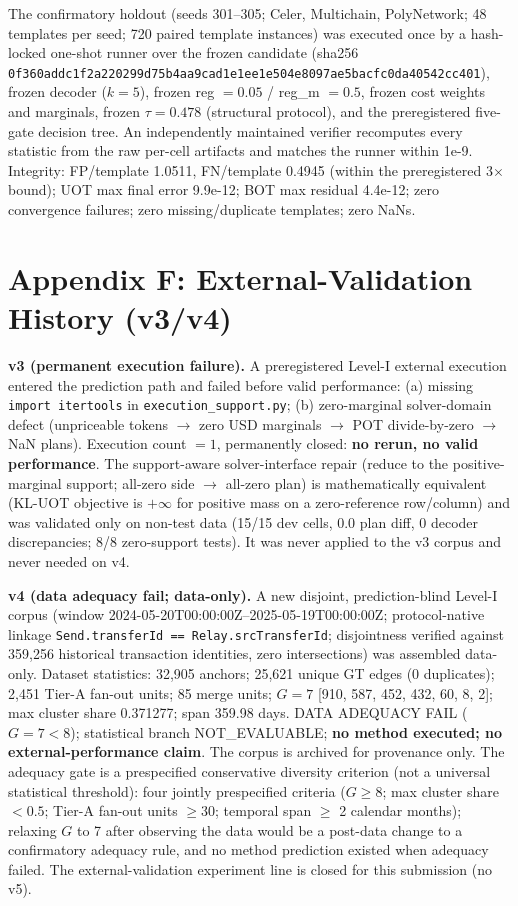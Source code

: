 \documentclass[journal]{IEEEtran}
\begin{document}
The confirmatory holdout (seeds 301--305; Celer, Multichain, PolyNetwork; 48 templates per seed; 720 paired template instances) was executed once by a hash-locked one-shot runner over the frozen candidate (sha256 \texttt{0f360add\-c1f2a220\-299d75b4\-aa9cad1e\-1ee1e504\-e8097ae5\-bacfc0da\-40542cc401}), frozen decoder ($k=5$), frozen reg $=0.05$ / reg\_m $=0.5$, frozen cost weights and marginals, frozen $\tau = 0.478$ (structural protocol), and the preregistered five-gate decision tree. An independently maintained verifier recomputes every statistic from the raw per-cell artifacts and matches the runner within 1e-9. Integrity: FP/template 1.0511, FN/template 0.4945 (within the preregistered 3$\times$ bound); UOT max final error 9.9e-12; BOT max residual 4.4e-12; zero convergence failures; zero missing/duplicate templates; zero NaNs.

\section*{Appendix F: External-Validation History (v3/v4)}

\textbf{v3 (permanent execution failure).} A preregistered Level-I external execution entered the prediction path and failed before valid performance: (a) missing \texttt{import itertools} in \texttt{execution\_support.py}; (b) zero-marginal solver-domain defect (unpriceable tokens $\to$ zero USD marginals $\to$ POT divide-by-zero $\to$ NaN plans). Execution count $= 1$, permanently closed: \textbf{no rerun, no valid performance}. The support-aware solver-interface repair (reduce to the positive-marginal support; all-zero side $\to$ all-zero plan) is mathematically equivalent (KL-UOT objective is $+\infty$ for positive mass on a zero-reference row/column) and was validated only on non-test data (15/15 dev cells, 0.0 plan diff, 0 decoder discrepancies; 8/8 zero-support tests). It was never applied to the v3 corpus and never needed on v4.

\textbf{v4 (data adequacy fail; data-only).} A new disjoint, prediction-blind Level-I corpus (window 2024-05-20T00:00:00Z--2025-05-19T00:00:00Z; protocol-native linkage \texttt{Send.transferId == Relay.srcTransferId}; disjointness verified against 359{,}256 historical transaction identities, zero intersections) was assembled data-only. Dataset statistics: 32{,}905 anchors; 25{,}621 unique GT edges (0 duplicates); 2{,}451 Tier-A fan-out units; 85 merge units; $G = 7$ [910, 587, 452, 432, 60, 8, 2]; max cluster share 0.371277; span 359.98 days. DATA ADEQUACY FAIL ($G = 7 < 8$); statistical branch NOT\_EVALUABLE; \textbf{no method executed; no external-performance claim}. The corpus is archived for provenance only. The adequacy gate is a prespecified conservative diversity criterion (not a universal statistical threshold): four jointly prespecified criteria ($G \ge 8$; max cluster share $< 0.5$; Tier-A fan-out units $\ge 30$; temporal span $\ge$ 2 calendar months); relaxing $G$ to 7 after observing the data would be a post-data change to a confirmatory adequacy rule, and no method prediction existed when adequacy failed. The external-validation experiment line is closed for this submission (no v5).
\end{document}
